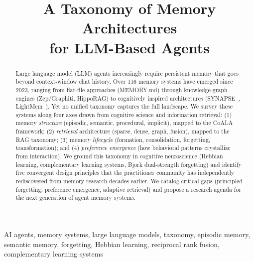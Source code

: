 \documentclass[conference]{IEEEtran}
\begin{document}
\title{A Taxonomy of Memory Architectures\\for LLM-Based Agents}

\author{
}

\maketitle
\pagestyle{plain}

\begin{abstract}
Large language model (LLM) agents increasingly require persistent memory
that goes beyond context-window chat history. Over 116 memory systems have
emerged since 2023, ranging from flat-file approaches (MEMORY.md) through
knowledge-graph engines (Zep/Graphiti, HippoRAG) to cognitively inspired
architectures (SYNAPSE~\cite{jiang2026synapse}, LightMem~\cite{fang2025lightmem}). Yet no unified taxonomy captures the full
landscape. We survey these systems along four axes drawn from cognitive
science and information retrieval: (1) memory \emph{structure} (episodic,
semantic, procedural, implicit), mapped to the CoALA framework; (2)
\emph{retrieval} architecture (sparse, dense, graph, fusion), mapped to
the RAG taxonomy; (3) memory \emph{lifecycle} (formation, consolidation,
forgetting, transformation); and (4) \emph{preference emergence} (how
behavioral patterns crystallize from interaction). We ground this taxonomy
in cognitive neuroscience (Hebbian learning, complementary learning
systems, Bjork dual-strength forgetting) and identify five convergent
design principles that the practitioner community has independently
rediscovered from memory research decades earlier. We catalog critical
gaps (principled forgetting, preference emergence, adaptive retrieval)
and propose a research agenda for the next generation of agent memory
systems.
\end{abstract}

\begin{IEEEkeywords}
AI agents, memory systems, large language models, taxonomy, episodic
memory, semantic memory, forgetting, Hebbian learning, reciprocal rank
fusion, complementary learning systems
\end{IEEEkeywords}
\end{document}
